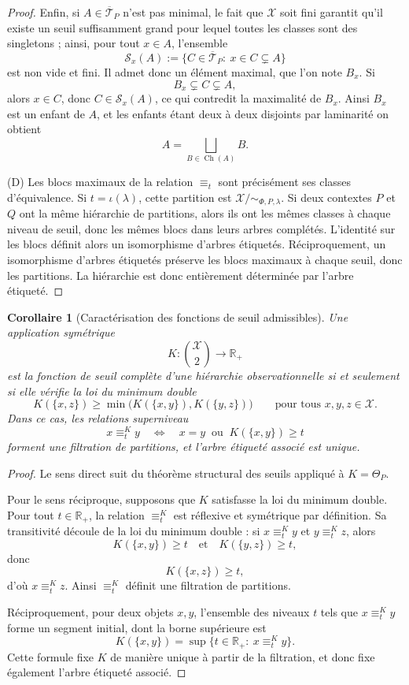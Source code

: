 \documentclass[11pt,a4paper]{article}
\newtheorem{corollary}{Corollaire}
\begin{document}
\begin{proof}
Enfin, si \(A\in\overline{\mathcal T}_P\) n'est pas minimal, le fait que \(\mathcal X\) soit fini garantit qu'il existe un seuil suffisamment grand pour lequel toutes les classes sont des singletons ; ainsi, pour tout \(x\in A\), l'ensemble
\[
\mathcal S_x(A):=\{C\in\overline{\mathcal T}_P:\ x\in C\subsetneq A\}
\]
est non vide et fini. Il admet donc un élément maximal, que l'on note \(B_x\). Si
\[
B_x\subsetneq C\subsetneq A,
\]
alors \(x\in C\), donc \(C\in\mathcal S_x(A)\), ce qui contredit la maximalité de \(B_x\). Ainsi \(B_x\) est un enfant de \(A\), et les enfants étant deux à deux disjoints par laminarité on obtient
\[
A=\bigsqcup_{B\in\operatorname{Ch}(A)}B.
\]

(D) Les blocs maximaux de la relation \(\equiv_t\) sont précisément ses classes d'équivalence. Si \(t=\iota(\lambda)\), cette partition est \(\mathcal X/{\sim_{\Phi,P,\lambda}}\). Si deux contextes \(P\) et \(Q\) ont la même hiérarchie de partitions, alors ils ont les mêmes classes à chaque niveau de seuil, donc les mêmes blocs dans leurs arbres complétés. L'identité sur les blocs définit alors un isomorphisme d'arbres étiquetés. Réciproquement, un isomorphisme d'arbres étiquetés préserve les blocs maximaux à chaque seuil, donc les partitions. La hiérarchie est donc entièrement déterminée par l'arbre étiqueté.
\end{proof}

\begin{corollary}[Caractérisation des fonctions de seuil admissibles]
Une application symétrique
\[
K:\binom{\mathcal X}{2}\longrightarrow \mathbb R_+
\]
est la fonction de seuil complète d'une hiérarchie observationnelle si et seulement si elle vérifie la loi du minimum double
\[
K(\{x,z\})\ge \min\bigl(K(\{x,y\}),K(\{y,z\})\bigr)
\qquad
\text{pour tous }x,y,z\in\mathcal X.
\]
Dans ce cas, les relations superniveau
\[
x\equiv_t^K y
\quad\Longleftrightarrow\quad
x=y\ \text{ ou }\ K(\{x,y\})\ge t
\]
forment une filtration de partitions, et l'arbre étiqueté associé est unique.
\end{corollary}

\begin{proof}
Le sens direct suit du théorème structural des seuils appliqué à \(K=\Theta_P\).

Pour le sens réciproque, supposons que \(K\) satisfasse la loi du minimum double. Pour tout \(t\in\mathbb R_+\), la relation \(\equiv_t^K\) est réflexive et symétrique par définition. Sa transitivité découle de la loi du minimum double : si \(x\equiv_t^K y\) et \(y\equiv_t^K z\), alors
\[
K(\{x,y\})\ge t \quad\text{et}\quad K(\{y,z\})\ge t,
\]
donc
\[
K(\{x,z\})\ge t,
\]
d'où \(x\equiv_t^K z\). Ainsi \(\equiv_t^K\) définit une filtration de partitions.

Réciproquement, pour deux objets \(x,y\), l'ensemble des niveaux \(t\) tels que \(x\equiv_t^K y\) forme un segment initial, dont la borne supérieure est
\[
K(\{x,y\})=\sup\{t\in\mathbb R_+:\ x\equiv_t^K y\}.
\]
Cette formule fixe \(K\) de manière unique à partir de la filtration, et donc fixe également l'arbre étiqueté associé.
\end{proof}
\end{document}
